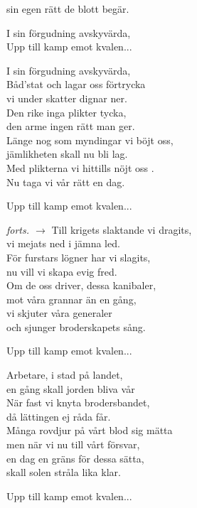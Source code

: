sin egen rätt de blott begär.\par
\vspace{10pt}
I sin förgudning avskyvärda,\\
Upp till kamp emot kvalen...\par
\vspace{10pt}
I sin förgudning avskyvärda,\\
Båd'stat och lagar oss förtrycka\\
vi under skatter dignar ner.\\
Den rike inga plikter tycka,\\
den arme ingen rätt man ger.\\
Länge nog som myndingar vi böjt oss,\\
jämlikheten skall nu bli lag.\\
Med plikterna vi hittills nöjt oss .\\
Nu taga vi vår rätt en dag.\par
\vspace{10pt}
Upp till kamp emot kvalen...\par
\vfill
\hfill {\footnotesize\textit{forts. $\rightarrow$}}
\newpage
Till krigets slaktande vi dragits,\\
vi mejats ned i jämna led.\\
För furstars lögner har vi slagits,\\
nu vill vi skapa evig fred.\\
Om de oss driver, dessa kanibaler,\\
mot våra grannar än en gång,\\
vi skjuter våra generaler\\
och sjunger broderskapets sång.\par
\vspace{10pt}
Upp till kamp emot kvalen...\par
\vspace{10pt}
Arbetare, i stad på landet,\\
en gång skall jorden bliva vår\\
När fast vi knyta brodersbandet,\\
då lättingen ej råda får.\\
Många rovdjur på vårt blod sig mätta\\
men när vi nu till vårt försvar,\\
en dag en gräns för dessa sätta,\\
skall solen stråla lika klar.\par
\vspace{10pt}
Upp till kamp emot kvalen...
